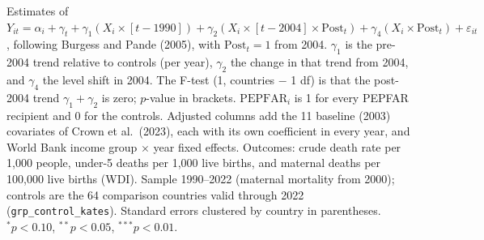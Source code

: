 \begin{table}[htbp]
\begin{minipage}{\textwidth}\footnotesize Estimates of $Y_{it} = \alpha_i + \gamma_t + \gamma_1 (X_i \times [t-1990]) + \gamma_2 (X_i \times [t-2004] \times \mathrm{Post}_t) + \gamma_4 (X_i \times \mathrm{Post}_t) + \varepsilon_{it}$, following Burgess and Pande (2005), with $\mathrm{Post}_t = 1$ from 2004. $\gamma_1$ is the pre-2004 trend relative to controls (per year), $\gamma_2$ the change in that trend from 2004, and $\gamma_4$ the level shift in 2004. The F-test (1, countries $-$ 1 df) is that the post-2004 trend $\gamma_1 + \gamma_2$ is zero; $p$-value in brackets. $\mathrm{PEPFAR}_i$ is 1 for every PEPFAR recipient and 0 for the controls. Adjusted columns add the 11 baseline (2003) covariates of Crown et al.\ (2023), each with its own coefficient in every year, and World Bank income group $\times$ year fixed effects. Outcomes: crude death rate per 1,000 people, under-5 deaths per 1,000 live births, and maternal deaths per 100,000 live births (WDI). Sample 1990--2022 (maternal mortality from 2000); controls are the 64 comparison countries valid through 2022 (\texttt{grp\_control\_kates}). Standard errors clustered by country in parentheses. $^{*}p<0.10$, $^{**}p<0.05$, $^{***}p<0.01$.\end{minipage}
\end{table}
